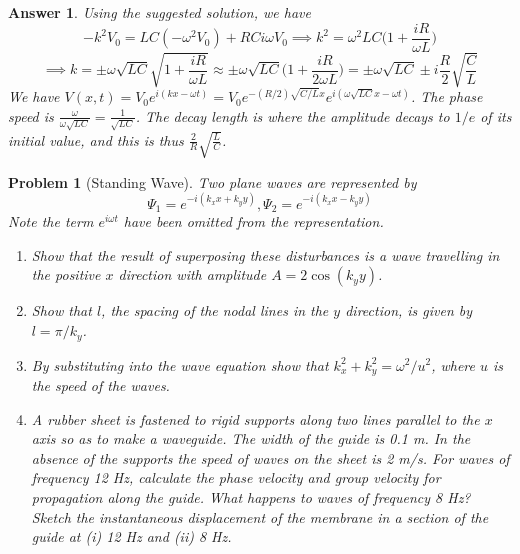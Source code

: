 \documentclass[a4paper]{article}
\newtheorem{ans}{Answer}[section]
\theoremstyle{new}
\newtheorem{qns}{Problem}[section]
\begin{document}
\begin{ans}
Using the suggested solution, we have 
$$-k^2V_0=LC(-\omega^2V_0)+RCi\omega V_0\implies k^2=\omega^2LC\bigg(1+\frac{iR}{\omega L}\bigg)$$
$$\implies k=\pm\omega\sqrt{LC}\sqrt{1+\frac{iR}{\omega L}}\approx\pm\omega\sqrt{LC}\bigg(1+\frac{iR}{2\omega L}\bigg)=\pm\omega\sqrt{LC}\pm i\frac{R}{2}\sqrt{\frac{C}{L}}$$
We have $V(x,t)=V_0e^{i(kx-\omega t)}=V_0e^{-(R/2)\sqrt{C/L}x}e^{i(\omega\sqrt{LC}x-\omega t)}$. The phase speed is $\frac{\omega}{\omega\sqrt{LC}}=\frac{1}{\sqrt{LC}}$. The decay length is where the amplitude decays to $1/e$ of its initial value, and this is thus $\frac{2}{R}\sqrt{\frac{L}{C}}$.
\end{ans}
\begin{qns}[Standing Wave]
Two plane waves are represented by
$$\Psi_1=e^{-i(k_xx+k_yy)},\Psi_2=e^{-i(k_xx-k_yy)}$$
Note the term $e^{i\omega t}$ have been omitted from the representation.
\begin{enumerate}[label=(\alph*)]
    \item Show that the result of superposing these disturbances is a wave travelling in the positive $x$ direction with amplitude $A = 2\cos(k_yy)$.
    \item Show that $l$, the spacing of the nodal lines in the $y$ direction, is given by $l=\pi/k_y$.
    \item By substituting into the wave equation show that $k_x^2+k_y^2=\omega^2/u^2$, where $u$ is the speed of the waves.
    \item A rubber sheet is fastened to rigid supports along two lines parallel to the $x$ axis so as to make a waveguide. The width of the guide is 0.1 m. In the absence of the supports the speed of waves on the sheet is 2 m/s. For waves of frequency 12 Hz, calculate the phase velocity and group velocity for propagation along the guide. What happens to waves of frequency 8 Hz? Sketch the instantaneous displacement of the membrane in a section of the guide at (i) 12 Hz and (ii) 8 Hz.
\end{enumerate}
\end{qns}
\end{document}
